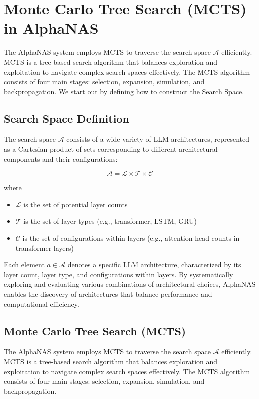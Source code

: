 \documentclass{article}
\begin{document}
\section{Monte Carlo Tree Search (MCTS) in AlphaNAS}
The AlphaNAS system employs MCTS to traverse the search space $\mathcal{A}$ efficiently. MCTS is a tree-based search algorithm that balances exploration and exploitation to navigate complex search spaces effectively. The MCTS algorithm consists of four main stages: selection, expansion, simulation, and backpropagation. We start out by defining how to construct the Search Space.

\subsection{Search Space Definition}
The search space $\mathcal{A}$ consists of a wide variety of LLM architectures, represented as a Cartesian product of sets corresponding to different architectural components and their configurations:

\begin{equation}
\mathcal{A} = \mathcal{L} \times \mathcal{T} \times \mathcal{C}
\end{equation}

where
\begin{itemize}
\item $\mathcal{L}$ is the set of potential layer counts
\item $\mathcal{T}$ is the set of layer types (e.g., transformer, LSTM, GRU)
\item $\mathcal{C}$ is the set of configurations within layers (e.g., attention head counts in transformer layers)
\end{itemize}

Each element $a \in \mathcal{A}$ denotes a specific LLM architecture, characterized by its layer count, layer type, and configurations within layers. By systematically exploring and evaluating various combinations of architectural choices, AlphaNAS enables the discovery of architectures that balance performance and computational efficiency.

\subsection{Monte Carlo Tree Search (MCTS)}

The AlphaNAS system employs MCTS to traverse the search space $\mathcal{A}$ efficiently. MCTS is a tree-based search algorithm that balances exploration and exploitation to navigate complex search spaces effectively. The MCTS algorithm consists of four main stages: selection, expansion, simulation, and backpropagation.
\end{document}
